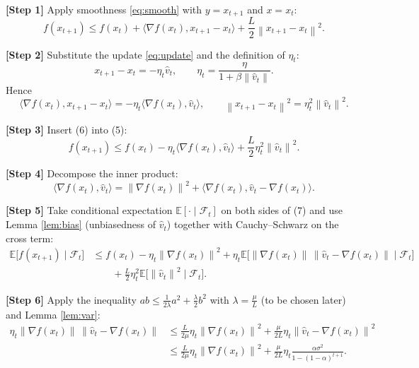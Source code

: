 \documentclass{article}
\newcommand{\EE}{\mathbb{E}}
\newcommand{\norm}[1]{\left\lVert #1\right\rVert}
\newcommand{\grad}{\nabla}
\begin{document}
\noindent\textbf{[Step 1]} Apply smoothness \eqref{eq:smooth} with $y=x_{t+1}$ and $x=x_{t}$:
\[
    f(x_{t+1})\le f(x_{t})+\langle\grad f(x_{t}),x_{t+1}-x_{t}\rangle
               +\frac{L}{2}\norm{x_{t+1}-x_{t}}^{2}.
\tag{5}
\]

\noindent\textbf{[Step 2]} Substitute the update \eqref{eq:update} and the definition of $\eta_{t}$:
\[
    x_{t+1}-x_{t}= -\eta_{t}\hat v_{t},
\qquad
\eta_{t}= \frac{\eta}{1+\beta\norm{\hat v_{t}}}.
\]
Hence
\[
    \langle\grad f(x_{t}),x_{t+1}-x_{t}\rangle
    = -\eta_{t}\langle\grad f(x_{t}),\hat v_{t}\rangle,
\qquad
    \norm{x_{t+1}-x_{t}}^{2}= \eta_{t}^{2}\norm{\hat v_{t}}^{2}.
\tag{6}
\]

\noindent\textbf{[Step 3]} Insert (6) into (5):
\[
    f(x_{t+1})\le f(x_{t})-\eta_{t}\langle\grad f(x_{t}),\hat v_{t}\rangle
                +\frac{L}{2}\eta_{t}^{2}\norm{\hat v_{t}}^{2}.
\tag{7}
\]

\noindent\textbf{[Step 4]} Decompose the inner product:
\[
    \langle\grad f(x_{t}),\hat v_{t}\rangle
    = \norm{\grad f(x_{t})}^{2}
      +\langle\grad f(x_{t}),\hat v_{t}-\grad f(x_{t})\rangle.
\tag{8}
\]

\noindent\textbf{[Step 5]} Take conditional expectation $\EE[\cdot\mid\mathcal{F}_{t}]$ on both sides of (7) and use Lemma \ref{lem:bias} (unbiasedness of $\hat v_{t}$) together with Cauchy–Schwarz on the cross term:
\[
\begin{aligned}
\EE\!\bigl[f(x_{t+1})\mid\mathcal{F}_{t}\bigr]
&\le f(x_{t})-\eta_{t}\norm{\grad f(x_{t})}^{2}
   +\eta_{t}\EE\!\bigl[\norm{\grad f(x_{t})}\,\norm{\hat v_{t}-\grad f(x_{t})}\mid\mathcal{F}_{t}\bigr] \\
&\qquad+\frac{L}{2}\eta_{t}^{2}\EE\!\bigl[\norm{\hat v_{t}}^{2}\mid\mathcal{F}_{t}\bigr].
\end{aligned}
\tag{9}
\]

\noindent\textbf{[Step 6]} Apply the inequality $ab\le \frac{1}{2\lambda}a^{2}+\frac{\lambda}{2}b^{2}$ with $\lambda= \frac{\mu}{L}$ (to be chosen later) and Lemma \ref{lem:var}:
\[
\begin{aligned}
\eta_{t}\norm{\grad f(x_{t})}\,\norm{\hat v_{t}-\grad f(x_{t})}
&\le
\frac{L}{2\mu}\eta_{t}\norm{\grad f(x_{t})}^{2}
    +\frac{\mu}{2L}\eta_{t}\norm{\hat v_{t}-\grad f(x_{t})}^{2}\\
&\le
\frac{L}{2\mu}\eta_{t}\norm{\grad f(x_{t})}^{2}
    +\frac{\mu}{2L}\eta_{t}\frac{\alpha\sigma^{2}}{1-(1-\alpha)^{t+1}} .
\end{aligned}
\tag{10}
\]
\end{document}
